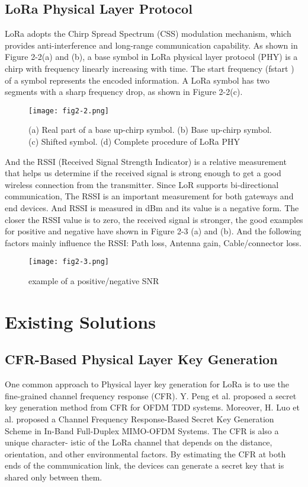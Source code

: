 \subsection{LoRa Physical Layer Protocol}
LoRa adopts the Chirp Spread Spectrum (CSS) modulation mechanism, which provides anti-interference and long-range communication capability. As shown in Figure 2-2(a) and (b), a base symbol in LoRa physical layer protocol (PHY) is a chirp with frequency linearly increasing with time. The start frequency (fstart ) of a symbol represents the encoded information. A LoRa symbol has two segments with a sharp frequency drop, as shown in Figure 2-2(c).
\begin{figure}
  \centering
  \texttt{[image: fig2-2.png]}
  \caption{(a) Real part of a base up-chirp symbol. (b) Base up-chirp symbol. (c) Shifted symbol. (d) Complete procedure of LoRa PHY\cite{10.1145/3546869}}
  \label{fig:2-2}
\end{figure}
And the RSSI (Received Signal Strength Indicator) is a relative measurement that helps us determine if the received signal is strong enough to get a good wireless connection from the transmitter. Since LoR supports bi-directional communication, The RSSI is an important measurement for both gateways and end devices. And RSSI is measured in dBm and its value is a negative form. The closer the RSSI value is to zero, the received signal is stronger, the good examples for positive and negative have shown in Figure 2-3 (a) and (b)\cite{rssiandsnrfigure}. And the following factors mainly influence the RSSI: Path loss, Antenna gain, Cable/connector loss.
\begin{figure}
  \centering
  \texttt{[image: fig2-3.png]}
  \caption{example of a positive/negative SNR}
  \label{fig:2-3}
\end{figure}

\section{Existing Solutions}
\subsection{CFR-Based Physical Layer Key Generation}
One common approach to Physical layer key generation for LoRa is to use the fine-grained channel frequency response (CFR). Y. Peng et al. proposed a secret key generation method from CFR for OFDM TDD systems\cite{7054386}. Moreover, H. Luo et al. proposed a Channel Frequency Response-Based Secret Key Generation Scheme in In-Band Full-Duplex MIMO-OFDM Systems\cite{10158732}. The CFR is also a unique character-
istic of the LoRa channel that depends on the distance, orientation, and other environmental factors. By estimating the CFR at both ends of the communication link, the devices can generate a secret key that is shared only between them.
